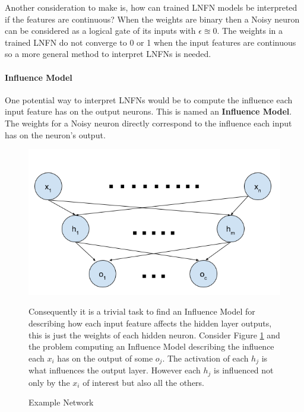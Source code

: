 Another consideration to make is, how can trained LNFN models be interpreted if the features are continuous? When the weights are binary then a Noisy neuron can be considered as a logical gate of its inputs with $\epsilon \approxeq 0$. The weights in a trained LNFN do not converge to 0 or 1 when the input features are continuous so a more general method to interpret LNFNs is needed.

\paragraph{Influence Model}
One potential way to interpret LNFNs would be to compute the influence each input feature has on the output neurons. This is named an \textbf{Influence Model}.  The weights for a Noisy neuron directly correspond to the influence each input has on the neuron's output. 

\begin{figure}[H]
	\centering
	\begin{minipage}[t]{0.5\textwidth}
		\vspace{0px}
		\includegraphics[width=\textwidth]{NetworkExample.png}
		\caption{Example Network}
		\label{fig:network-example}
	\end{minipage}
	\hspace{1px}
	\begin{minipage}[t]{0.45\textwidth}
		\vspace{2px}
		Consequently it is a trivial task to find an Influence Model for describing how each input feature affects the hidden layer outputs, this is just the weights of each hidden neuron. Consider Figure \ref{fig:network-example}  and the problem computing an Influence Model describing the influence each $x_i$ has on the output of some $o_j$. The activation of each $h_j$ is what influences the output layer. However each $h_j$ is influenced not only by the $x_i$ of interest but also all the others.
	\end{minipage}
	\hfill
\end{figure}

